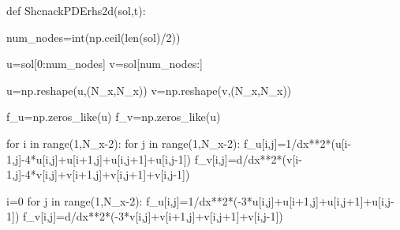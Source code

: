\documentclass[
  letterpaper,
  DIV=11,
  numbers=noendperiod]{scrreprt}
\newenvironment{Shaded}{\begin{snugshade}}{\end{snugshade}}
\newcommand{\BuiltInTok}[1]{\textcolor[rgb]{0.00,0.23,0.31}{#1}}
\newcommand{\ControlFlowTok}[1]{\textcolor[rgb]{0.00,0.23,0.31}{#1}}
\newcommand{\DecValTok}[1]{\textcolor[rgb]{0.68,0.00,0.00}{#1}}
\newcommand{\KeywordTok}[1]{\textcolor[rgb]{0.00,0.23,0.31}{#1}}
\newcommand{\NormalTok}[1]{\textcolor[rgb]{0.00,0.23,0.31}{#1}}
\newcommand{\OperatorTok}[1]{\textcolor[rgb]{0.37,0.37,0.37}{#1}}
\theoremstyle{plain}
\theoremstyle{definition}
\theoremstyle{plain}
\theoremstyle{remark}
\begin{document}
\begin{Shaded}
\begin{Highlighting}[]
\KeywordTok{def}\NormalTok{ ShcnackPDErhs2d(sol,t):}

\NormalTok{    num\_nodes}\OperatorTok{=}\BuiltInTok{int}\NormalTok{(np.ceil(}\BuiltInTok{len}\NormalTok{(sol)}\OperatorTok{/}\DecValTok{2}\NormalTok{))}

\NormalTok{    u}\OperatorTok{=}\NormalTok{sol[}\DecValTok{0}\NormalTok{:num\_nodes]}
\NormalTok{    v}\OperatorTok{=}\NormalTok{sol[num\_nodes:]}


\NormalTok{    u}\OperatorTok{=}\NormalTok{np.reshape(u,(N\_x,N\_x))}
\NormalTok{    v}\OperatorTok{=}\NormalTok{np.reshape(v,(N\_x,N\_x))}

\NormalTok{    f\_u}\OperatorTok{=}\NormalTok{np.zeros\_like(u)}
\NormalTok{    f\_v}\OperatorTok{=}\NormalTok{np.zeros\_like(u)}

 

    \ControlFlowTok{for}\NormalTok{ i }\KeywordTok{in} \BuiltInTok{range}\NormalTok{(}\DecValTok{1}\NormalTok{,N\_x}\OperatorTok{{-}}\DecValTok{2}\NormalTok{):}
      \ControlFlowTok{for}\NormalTok{ j }\KeywordTok{in} \BuiltInTok{range}\NormalTok{(}\DecValTok{1}\NormalTok{,N\_x}\OperatorTok{{-}}\DecValTok{2}\NormalTok{):}
\NormalTok{        f\_u[i,j]}\OperatorTok{=}\DecValTok{1}\OperatorTok{/}\NormalTok{dx}\OperatorTok{**}\DecValTok{2}\OperatorTok{*}\NormalTok{(u[i}\OperatorTok{{-}}\DecValTok{1}\NormalTok{,j]}\OperatorTok{{-}}\DecValTok{4}\OperatorTok{*}\NormalTok{u[i,j]}\OperatorTok{+}\NormalTok{u[i}\OperatorTok{+}\DecValTok{1}\NormalTok{,j]}\OperatorTok{+}\NormalTok{u[i,j}\OperatorTok{+}\DecValTok{1}\NormalTok{]}\OperatorTok{+}\NormalTok{u[i,j}\OperatorTok{{-}}\DecValTok{1}\NormalTok{]) }
\NormalTok{        f\_v[i,j]}\OperatorTok{=}\NormalTok{d}\OperatorTok{/}\NormalTok{dx}\OperatorTok{**}\DecValTok{2}\OperatorTok{*}\NormalTok{(v[i}\OperatorTok{{-}}\DecValTok{1}\NormalTok{,j]}\OperatorTok{{-}}\DecValTok{4}\OperatorTok{*}\NormalTok{v[i,j]}\OperatorTok{+}\NormalTok{v[i}\OperatorTok{+}\DecValTok{1}\NormalTok{,j]}\OperatorTok{+}\NormalTok{v[i,j}\OperatorTok{+}\DecValTok{1}\NormalTok{]}\OperatorTok{+}\NormalTok{v[i,j}\OperatorTok{{-}}\DecValTok{1}\NormalTok{]) }

\NormalTok{    i}\OperatorTok{=}\DecValTok{0} 
    \ControlFlowTok{for}\NormalTok{ j }\KeywordTok{in} \BuiltInTok{range}\NormalTok{(}\DecValTok{1}\NormalTok{,N\_x}\OperatorTok{{-}}\DecValTok{2}\NormalTok{):}
\NormalTok{      f\_u[i,j]}\OperatorTok{=}\DecValTok{1}\OperatorTok{/}\NormalTok{dx}\OperatorTok{**}\DecValTok{2}\OperatorTok{*}\NormalTok{(}\OperatorTok{{-}}\DecValTok{3}\OperatorTok{*}\NormalTok{u[i,j]}\OperatorTok{+}\NormalTok{u[i}\OperatorTok{+}\DecValTok{1}\NormalTok{,j]}\OperatorTok{+}\NormalTok{u[i,j}\OperatorTok{+}\DecValTok{1}\NormalTok{]}\OperatorTok{+}\NormalTok{u[i,j}\OperatorTok{{-}}\DecValTok{1}\NormalTok{]) }
\NormalTok{      f\_v[i,j]}\OperatorTok{=}\NormalTok{d}\OperatorTok{/}\NormalTok{dx}\OperatorTok{**}\DecValTok{2}\OperatorTok{*}\NormalTok{(}\OperatorTok{{-}}\DecValTok{3}\OperatorTok{*}\NormalTok{v[i,j]}\OperatorTok{+}\NormalTok{v[i}\OperatorTok{+}\DecValTok{1}\NormalTok{,j]}\OperatorTok{+}\NormalTok{v[i,j}\OperatorTok{+}\DecValTok{1}\NormalTok{]}\OperatorTok{+}\NormalTok{v[i,j}\OperatorTok{{-}}\DecValTok{1}\NormalTok{]) }


\end{Highlighting}
\end{Shaded}
\end{document}
